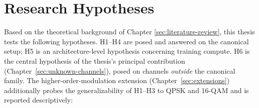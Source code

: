 \section{Research Hypotheses}\label{sec:research-hypotheses}

Based on the theoretical background of Chapter \ref{sec:literature-review}, this thesis tests the following hypotheses. H1--H4 are posed and answered on the canonical setup; H5 is an architecture-level hypothesis concerning training compute. H6 is the central hypothesis of the thesis's principal contribution (Chapter~\ref{sec:unknown-channels}), posed on channels \emph{outside} the canonical family. The higher-order-modulation extension (Chapter~\ref{sec:extensions}) additionally probes the generalizability of H1--H3 to QPSK and 16-QAM and is reported descriptively:

